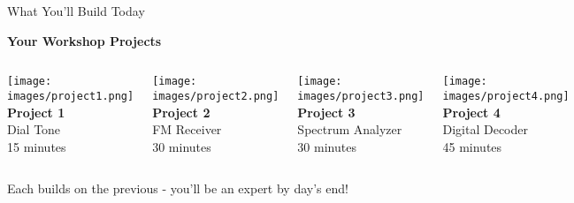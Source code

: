 \documentclass[aspectratio=169,11pt]{beamer}
\newcommand{\highlight}[1]{\colorbox{yellow!30}{#1}}
\begin{document}
\begin{frame}{What You'll Build Today}
\begin{center}
\Large\textbf{Your Workshop Projects}
\end{center}
\vspace{1em}
\begin{columns}
\begin{center}
\texttt{[image: images/project1.png]}
\textbf{Project 1}\\
\textcolor{radioblue}{Dial Tone}\\
\small 15 minutes
\end{center}

\begin{center}
\texttt{[image: images/project2.png]}
\textbf{Project 2}\\
\textcolor{radiogreen}{FM Receiver}\\
\small 30 minutes
\end{center}

\begin{center}
\texttt{[image: images/project3.png]}
\textbf{Project 3}\\
\textcolor{radioorange}{Spectrum Analyzer}\\
\small 30 minutes
\end{center}

\begin{center}
\texttt{[image: images/project4.png]}
\textbf{Project 4}\\
\textcolor{radiopurple}{Digital Decoder}\\
\small 45 minutes
\end{center}
\end{columns}
\vspace{1em}
\begin{center}
\Large\highlight{Each builds on the previous - you'll be an expert by day's end!}
\end{center}
\end{frame}
\end{document}
